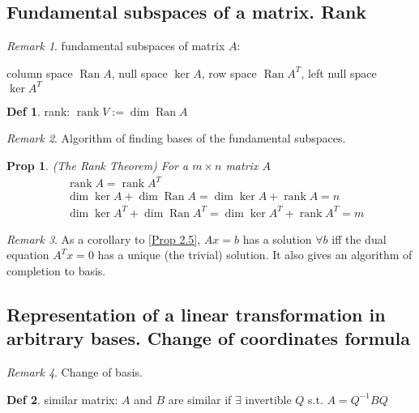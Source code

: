 \documentclass[hidelinks]{article}
\theoremstyle{definition}
\newtheorem*{defin}{Def}
\theoremstyle{plain}
\newtheorem{proposition}[theorem]{Prop}
\theoremstyle{remark}
\newtheorem*{remark}{Remark}
\DeclareMathOperator{\range}{Ran}
\DeclareMathOperator{\rank}{rank}
\begin{document}
\subsection{Fundamental subspaces of a matrix. Rank}

\begin{remark}
fundamental subspaces of matrix $A$:
\begin{center}
    column space $\range A$, null space $\ker A$, row space $\range A^T$, left null space  $\ker A^T$
\end{center} 
\end{remark}

\begin{defin}
rank: $\rank V:= \dim \range A$
\end{defin}

\begin{remark}
Algorithm of finding bases of the fundamental subspaces.
\end{remark}

\begin{proposition}\label{Prop 2.5} (The Rank Theorem) For a $m\times n$ matrix $A$
\begin{align*}
    & \rank A=\rank A^T \\
    & \dim \ker A+\dim \range A=\dim \ker A+\rank A=n \\
    & \dim \ker A^T+\dim \range A^T=\dim \ker A^T+\rank A^T=m
\end{align*}
\end{proposition}

\begin{remark}
As a corollary to \autoref{Prop 2.5}, $Ax=b$ has a solution $\forall b$ iff the dual equation $A^Tx=0$ has a unique (the trivial) solution. It also gives an algorithm of completion to basis.
\end{remark}

\subsection{Representation of a linear transformation in arbitrary
bases. Change of coordinates formula}

\begin{remark}
Change of basis.
\end{remark}

\begin{defin}
similar matrix: $A$ and $B$ are similar if $\exists$ invertible $Q$ s.t. $A=Q^{-1}BQ$
\end{defin}
\end{document}
